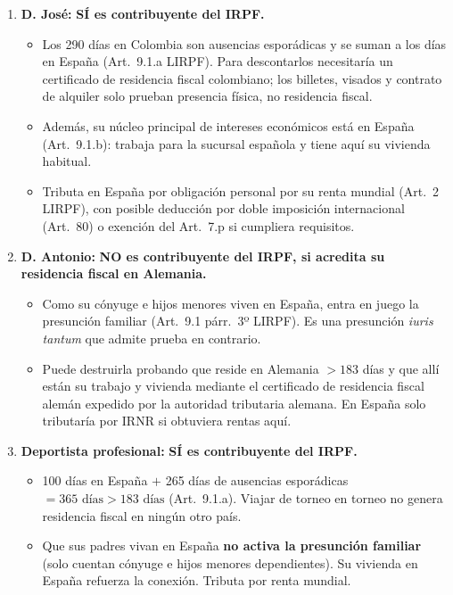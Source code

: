 \documentclass[11pt,a4paper,openany]{article}
\begin{document}
\begin{solucionBox}
\begin{enumerate}[label=\alph*.]
    \item \textbf{D. José:} \textbf{SÍ es contribuyente del IRPF.}
    \begin{itemize}
        \item Los 290 días en Colombia son ausencias esporádicas y se suman a los días en España (Art.~9.1.a LIRPF). Para descontarlos necesitaría un certificado de residencia fiscal colombiano; los billetes, visados y contrato de alquiler solo prueban presencia física, no residencia fiscal.
        \item Además, su núcleo principal de intereses económicos está en España (Art.~9.1.b): trabaja para la sucursal española y tiene aquí su vivienda habitual.
        \item Tributa en España por obligación personal por su renta mundial (Art.~2 LIRPF), con posible deducción por doble imposición internacional (Art.~80) o exención del Art.~7.p si cumpliera requisitos.
    \end{itemize}
    
    \item \textbf{D. Antonio:} \textbf{NO es contribuyente del IRPF, si acredita su residencia fiscal en Alemania.}
    \begin{itemize}
        \item Como su cónyuge e hijos menores viven en España, entra en juego la presunción familiar (Art.~9.1 párr.~3º LIRPF). Es una presunción \textit{iuris tantum} que admite prueba en contrario.
        \item Puede destruirla probando que reside en Alemania $>183$ días y que allí están su trabajo y vivienda mediante el certificado de residencia fiscal alemán expedido por la autoridad tributaria alemana. En España solo tributaría por IRNR si obtuviera rentas aquí.
    \end{itemize}
    
    \item \textbf{Deportista profesional:} \textbf{SÍ es contribuyente del IRPF.}
    \begin{itemize}
        \item 100 días en España $+$ 265 días de ausencias esporádicas $= 365\text{ días} > 183\text{ días}$ (Art.~9.1.a). Viajar de torneo en torneo no genera residencia fiscal en ningún otro país.
        \item Que sus padres vivan en España \textbf{no activa la presunción familiar} (solo cuentan cónyuge e hijos menores dependientes). Su vivienda en España refuerza la conexión. Tributa por renta mundial.
    \end{itemize}
\end{enumerate}
\end{solucionBox}
\end{document}
